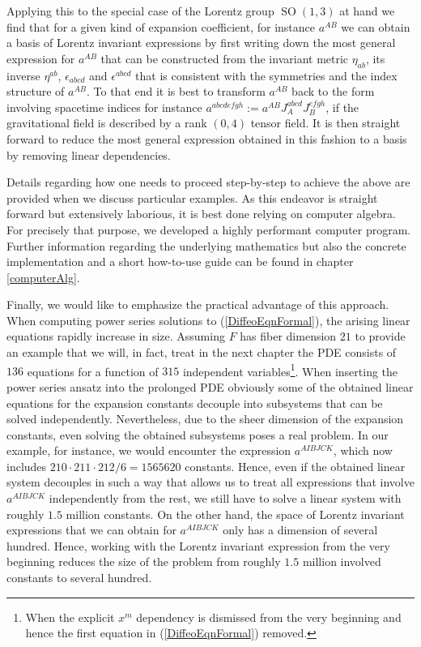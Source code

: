 Applying this to the special case of the Lorentz group $\operatorname{SO}(1,3)$ at hand we find that for a given kind of expansion coefficient, for instance $a^{AB}$ we can obtain a basis of Lorentz invariant expressions by first writing down the most general expression for $a^{AB}$ that can be constructed from the invariant metric $\eta_{ab}$, its inverse $\eta^{ab}$, $\epsilon_{abcd}$ and $\epsilon^{abcd}$ that is consistent with the symmetries and the index structure of $a^{AB}$. To that end it is best to transform $a^{AB}$ back to the form involving spacetime indices for instance $a^{abcdefgh} := a^{AB}J_A^{abcd}J_B^{efgh}$, if the gravitational field is described by a rank $(0,4)$ tensor field. It is then straight forward to reduce the most general expression obtained in this fashion to a basis by removing linear dependencies.

Details regarding how one needs to proceed step-by-step to achieve the above are provided when we discuss particular examples. As this endeavor is straight forward but extensively laborious, it is best done relying on computer algebra. For precisely that purpose, we developed a highly performant computer program. 
Further information regarding the underlying mathematics but also the concrete implementation and a short how-to-use guide can be found in chapter \ref{computerAlg}. 

Finally, we would like to emphasize the practical advantage of this approach. When computing power series solutions to (\ref{DiffeoEqnFormal}), the arising linear equations rapidly increase in size. Assuming $F$ has fiber dimension $21$ to provide an example that we will, in fact, treat in the next chapter the PDE consists of $136$ equations for a function of $315$ independent variables\footnote{When the explicit $x^m$ dependency is dismissed from the very beginning and hence the first equation in (\ref{DiffeoEqnFormal}) removed.}.  When inserting the power series ansatz into the prolonged PDE obviously some of the obtained linear equations for the expansion constants decouple into subsystems that can be solved independently. Nevertheless, due to the sheer dimension of the expansion constants, even solving the obtained subsystems poses a real problem. In our example, for instance, we would encounter the expression $a^{AIBJCK}$, which now includes $210\cdot 211\cdot212/6=1565620$ constants. Hence, even if the obtained linear system decouples in such a way that allows us to treat all expressions that involve $a^{AIBJCK}$ independently from the rest, we still have to solve a linear system with roughly $1.5$ million constants. On the other hand, the space of Lorentz invariant expressions that we can obtain for $a^{AIBJCK}$ only has a dimension of several hundred. Hence, working with the Lorentz invariant expression from the very beginning reduces the size of the problem from roughly $1.5$ million involved constants to several hundred. 

